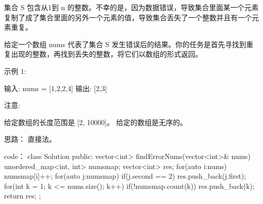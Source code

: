 集合 S 包含从1到 n 的整数。不幸的是，因为数据错误，导致集合里面某一个元素复制了成了集合里面的另外一个元素的值，导致集合丢失了一个整数并且有一个元素重复。

给定一个数组 nums 代表了集合 S 发生错误后的结果。你的任务是首先寻找到重复出现的整数，再找到丢失的整数，将它们以数组的形式返回。

示例 1:

输入: nums = [1,2,2,4]
输出: [2,3]

注意:

    给定数组的长度范围是 [2, 10000]。
    给定的数组是无序的。

























思路：
直接法。
























code：
class Solution {
public:
    vector<int> findErrorNums(vector<int>& nums) {
        unordered_map<int, int> numsmap;
        vector<int> res;
        for(auto i:nums)
            numsmap[i]++;
        for(auto j:numsmap)
        {
            if(j.second == 2) res.push_back(j.first);
        }
        for(int k = 1; k <= nums.size(); k++)
        {
            if(!numsmap.count(k)) res.push_back(k);
        }
        return res;
    }
};